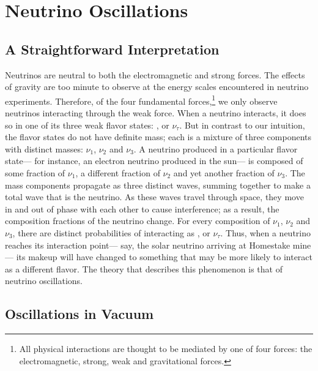 \chapter{Neutrino Oscillations}
\label{nu_osc_chapter}


\section{A Straightforward Interpretation}

Neutrinos are neutral to both the electromagnetic and strong forces.  The effects of gravity are too minute to observe at the energy scales encountered in neutrino experiments.  Therefore, of the four fundamental forces,\footnote{All physical interactions are thought to be mediated by one of four forces: the electromagnetic, strong, weak and gravitational forces.} we only observe neutrinos interacting through the weak force.  When a neutrino interacts, it does so in one of its three weak flavor states: \nue, \numu or $\nu_\tau$.  But in contrast to our intuition, the flavor states do not have definite mass; each is a mixture of three components with distinct masses: $\nu_1$, $\nu_2$ and $\nu_3$.    A neutrino produced in a particular flavor state--- for instance, an electron neutrino produced in the sun--- is composed of some fraction of $\nu_1$, a different fraction of $\nu_2$ and yet another fraction of $\nu_3$.  The mass components propagate as three distinct waves, summing together to make a total wave that is the neutrino.  As these waves travel through space, they move in and out of phase with each other to cause interference; as a result, the composition fractions of the neutrino change.  For every composition of $\nu_1$, $\nu_2$ and $\nu_3$, there are distinct probabilities of interacting as \nue, \numu or $\nu_\tau$.   Thus, when a neutrino reaches its interaction point--- say, the solar neutrino arriving at Homestake mine--- its makeup will have changed to something that may be more likely to interact as a different flavor.   The theory that describes this phenomenon is that of neutrino oscillations.  

\section{Oscillations in Vacuum}

